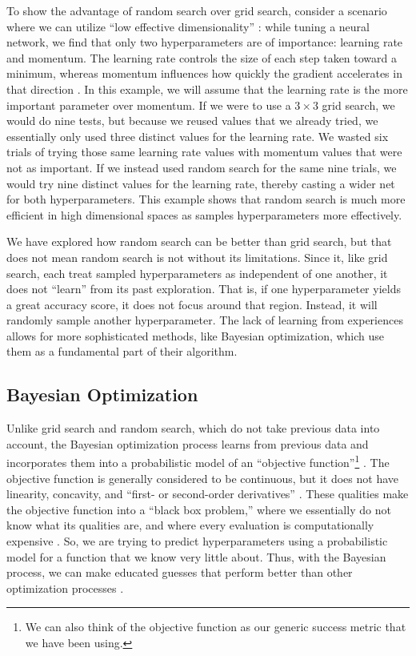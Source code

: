 \documentclass[stu,12pt,floatsintext]{apa7}
\begin{document}
To show the advantage of random search over grid search, consider a scenario where we can utilize ``low effective dimensionality'' \parencite{bergstra2012random}: while tuning a neural network, we find that only two hyperparameters are of importance: learning rate and momentum. The learning rate controls the size of each step taken toward a minimum, whereas momentum influences how quickly the gradient accelerates in that direction \parencite{orr_1999_momentum}. In this example, we will assume that the learning rate is the more important parameter over momentum. If we were to use a \(3 \times 3\) grid search, we would do nine tests, but because we reused values that we already tried, we essentially only used three distinct values for the learning rate. We wasted six trials of trying those same learning rate values with momentum values that were not as important. If we instead used random search for the same nine trials, we would try nine distinct values for the learning rate, thereby casting a wider net for both hyperparameters. This example shows that random search is much more efficient in high dimensional spaces as samples hyperparameters more effectively.

We have explored how random search can be better than grid search, but that does not mean random search is not without its limitations. Since it, like grid search, each treat sampled hyperparameters as independent of one another, it does not ``learn'' from its past exploration. That is, if one hyperparameter yields a great accuracy score, it does not focus around that region. Instead, it will randomly sample another hyperparameter. The lack of learning from experiences allows for more sophisticated methods, like Bayesian optimization, which use them as a fundamental part of their algorithm.  

\subsection{Bayesian Optimization}

Unlike grid search and random search, which do not take previous data into account, the Bayesian optimization process learns from previous data and incorporates them into a probabilistic model of an ``objective function''\footnote{We can also think of the objective function as our generic success metric that we have been using.} \parencite{frazier2018tutorial}. The objective function is generally considered to be continuous, but it does not have linearity, concavity, and ``first- or second-order derivatives'' \parencite{frazier2018tutorial}. These qualities make the objective function into a ``black box problem,'' where we essentially do not know what its qualities are, and where every evaluation is computationally expensive \parencite{WU201926}. So, we are trying to predict hyperparameters using a probabilistic model for a function that we know very little about. Thus, with the Bayesian process, we can make educated guesses that perform better than other optimization processes \parencite{WU201926}.
\end{document}
